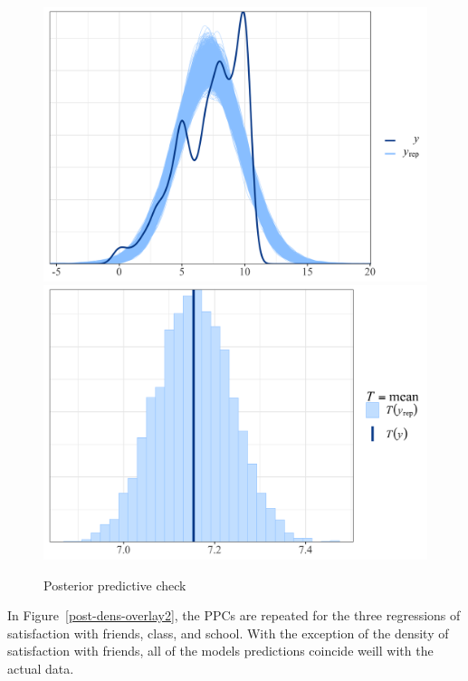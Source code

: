 \documentclass[a4, 12pt]{article}
\begin{document}
\begin{figure}[H]
\includegraphics[width=0.5\linewidth,]{../figures/post_dens_overlay} \includegraphics[width=0.5\linewidth,]{../figures/post_skew} \caption{Posterior predictive check}\label{fig:post-dens-overlay}
\end{figure}

In Figure~\ref{post-dens-overlay2}, the PPCs are repeated for the three regressions of satisfaction with friends, class, and school. With the exception of the density of satisfaction with friends, all of the models predictions coincide weill with the actual data.
\end{document}
